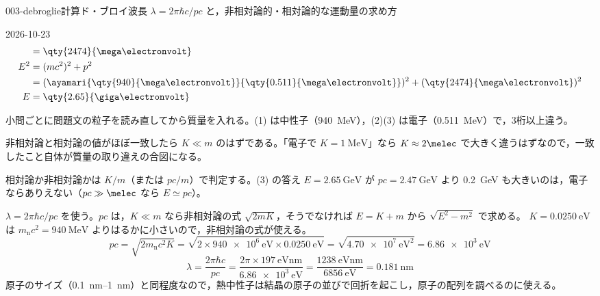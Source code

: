 \documentclass[uplatex,dvipdfmx,a4paper,11pt]{jsarticle}
\begin{document}
\begin{mondai}{003-debroglie}{計算}{ド・ブロイ波長 $\lambda=2\pi\hbar c/pc$ と，非相対論的・相対論的な運動量の求め方}
\begin{kotaeutsushi}{2026-10-23}
\begin{align*}
  &=\qty{2474}{\mega\electronvolt}\\
  E^{2}&=(mc^{2})^{2}+p^{2}\\
  &=(\ayamari{\qty{940}{\mega\electronvolt}}{\qty{0.511}{\mega\electronvolt}})^{2}+(\qty{2474}{\mega\electronvolt})^{2}\\
  E&=\qty{2.65}{\giga\electronvolt}
\end{align*}
\end{kotaeutsushi}
\begin{kizuki}
\item 小問ごとに問題文の粒子を読み直してから質量を入れる。(1) は中性子（\qty{940}{\mega\electronvolt}），(2)(3) は電子（\qty{0.511}{\mega\electronvolt}）で，3桁以上違う。
\item 非相対論と相対論の値がほぼ一致したら $K\ll m$ のはずである。「電子で $K=\qty{1}{\mega\electronvolt}$」なら $K\approx2\melec$ で大きく違うはずなので，一致したこと自体が質量の取り違えの合図になる。
\item 相対論か非相対論かは $K/m$（または $pc/m$）で判定する。(3) の答え $E=\qty{2.65}{\giga\electronvolt}$ が $pc=\qty{2.47}{\giga\electronvolt}$ より \qty{0.2}{\giga\electronvolt} も大きいのは，電子ならありえない（$pc\gg\melec$ なら $E\simeq pc$）。
\end{kizuki}
\begin{tadashii}
\houshin $\lambda=2\pi\hbar c/pc$ を使う。$pc$ は，$K\ll m$ なら非相対論の式 $\sqrt{2mK}$，そうでなければ $E=K+m$ から $\sqrt{E^2-m^2}$ で求める。
\keisan {} $K=\qty{0.0250}{\electronvolt}$ は $m_{\mathrm{n}}c^2=\qty{940}{\mega\electronvolt}$ よりはるかに小さいので，非相対論の式が使える。
\[ pc=\sqrt{2m_{\mathrm{n}}c^2K}=\sqrt{2\times\qty{940e6}{\electronvolt}\times\qty{0.0250}{\electronvolt}}=\sqrt{\qty{4.70e7}{\electronvolt\squared}}=\qty{6.86e3}{\electronvolt} \]
\[ \lambda=\frac{2\pi\hbar c}{pc}=\frac{2\pi\times\qty{197}{\electronvolt\nano\metre}}{\qty{6.86e3}{\electronvolt}}=\frac{\qty{1238}{\electronvolt\nano\metre}}{\qty{6856}{\electronvolt}}=\qty{0.181}{\nano\metre} \]
原子のサイズ（\qty{0.1}{\nano\metre}--\qty{1}{\nano\metre}）と同程度なので，熱中性子は結晶の原子の並びで回折を起こし，原子の配列を調べるのに使える。


\end{tadashii}
\end{mondai}
\end{document}
